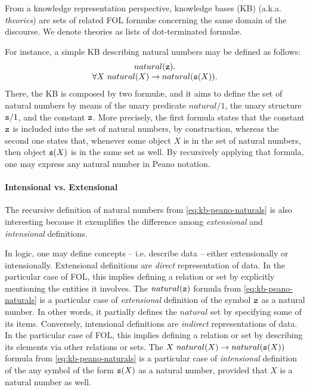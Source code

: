 \documentclass[12pt,a4paper,openright,twoside]{book}
\begin{document}
From a knowledge representation perspective, knowledge bases (KB) (a.k.a. \emph{theories}) are sets of related FOL formul\ae{} concerning the same domain of the discourse.
%
We denote theories as lists of dot-terminated formul\ae.

For instance, a simple KB describing natural numbers may be defined as follows:
%
\begin{equation}\label{eq:kb-peano-naturals}
    \begin{array}{c}
        natural(\mathtt{z}).
        \\
        \forall X\ natural(X) \rightarrow natural(\mathtt{s}(X)).
    \end{array}
\end{equation}
%
There, the KB is composed by two formul\ae, and it aims to define the set of natural numbers by means of the unary predicate $natural/1$, the unary structure $\mathtt{s}/1$, and the constant $\mathtt{z}$.
%
More precisely, the first formula states that the constant $\mathtt{z}$ is included into the set of natural numbers, by construction, whereas the second one states that, whenever some object $X$ is in the set of natural numbers, then object $\mathtt{s}(X)$ is in the same set as well.
%
By recursively applying that formula, one may express any natural number in Peano notation.

\paragraph{Intensional vs. Extensional}

The recursive definition of natural numbers from \cref{eq:kb-peano-naturals} is also interesting because it exemplifies the difference among \emph{extensional} and \emph{intensional} definitions.

In logic, one may define concepts -- i.e. describe data -- either extensionally or intensionally.
%
Extensional definitions are \emph{direct} representation of data.
%
In the particular case of FOL, this implies defining a relation or set by explicitly mentioning the entities it involves.
%
The $natural(\mathtt{z})$ formula from \cref{eq:kb-peano-naturals} is a particular case of \emph{extensional} definition of the symbol $\mathtt{z}$ as a natural number.
%
In other words, it partially defines the $natural$ set by specifying some of its items.
%
Conversely, intensional definitions are \emph{indirect} representations of data.
%
In the particular case of FOL, this implies defining a relation or set by describing its elements via other relations or sets.
%
The $X\ natural(X) \rightarrow natural(\functor{s}(X))$ formula from \cref{eq:kb-peano-naturals} is a particular case of \emph{intensional} definition of the any symbol of the form $\mathtt{s}(X)$ as a natural number, provided that $X$ is a natural number as well.
\end{document}

